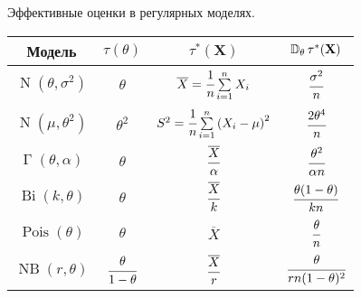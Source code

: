 \begin{mytable}
    \begin{center}
        \caption{Эффективные оценки в регулярных моделях.}
        \vspace{3mm}
        \begin{tabular}{|c|c|c|c|}
            \hline Модель                                  & $\tau(\theta)$               & $\tau^*(\mathbf{X})$                                                   & $\mathbb{D}_{\theta}\, \tau^*(\mathbf{X})$ \\[12pt]
            \hline $\operatorname{N}(\theta, \sigma^2)$    & $\theta$                     & $\overline{X} = \cfrac{1}{n} \sum\limits_{i=1}^{n} X_i$                & $\cfrac{\sigma^2}{n}$ \\[12pt]
            \hline $\operatorname{N}(\mu, \theta^2)$       & $\theta^2$                   & $S^2 = \cfrac{1}{n} \sum\limits_{i=1}^{n} \left(X_i - \mu\right)^2$    & $\cfrac{2\theta^4}{n}$ \\[12pt]
            \hline $\operatorname{\Gamma}(\theta, \alpha)$ & $\theta$                     & $\cfrac{\overline{X}}{\alpha}$                                         & $\cfrac{\theta^2}{\alpha n}$ \\[12pt]
            \hline $\operatorname{Bi}(k, \theta)$          & $\theta$                     & $\cfrac{\overline{X}}{k}$                                              & $\cfrac{\theta(1 - \theta)}{kn}$ \\[12pt]
            \hline $\operatorname{Pois}(\theta)$           & $\theta$                     & $\overline{X}$                                                         & $\cfrac{\theta}{n}$ \\[12pt]
            \hline $\operatorname{NB}(r, \theta)$          & $\cfrac{\theta}{1 - \theta}$ & $\cfrac{\overline{X}}{r}$                                              & $\cfrac{\theta}{rn(1 - \theta)^2}$ \\[12pt]
            \hline
        \end{tabular}
    \end{center}
\end{mytable}